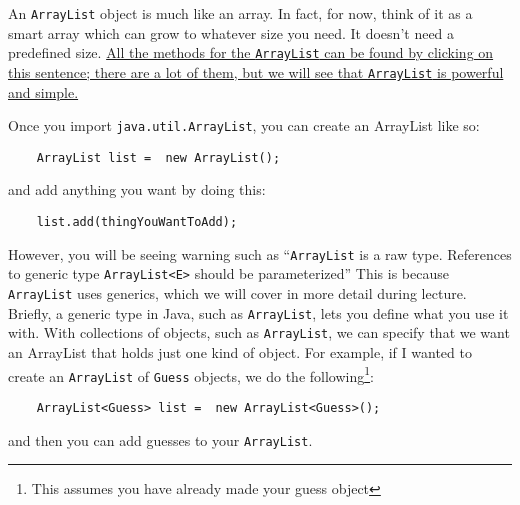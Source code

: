 \documentclass[10pt,letterpaper]{article}
\begin{document}
	
	An \texttt{ArrayList} object is much like an array.  
	In fact, for now, think of it as a smart array which can grow to whatever size you need.
	It doesn't need a predefined size.
	\href{https://docs.oracle.com/javase/8/docs/api/java/util/ArrayList.html}{All the methods for the \texttt{ArrayList}  can be found by clicking on this sentence;  there are a lot of them, but we will see that \texttt{ArrayList}  is powerful and simple.}
	
	Once you import \texttt{java.util.ArrayList}, you can create an ArrayList like so:
	
	\begin{lstlisting}
	ArrayList list =  new ArrayList();
	\end{lstlisting}
	
	and add anything you want by doing this:
	
	\begin{lstlisting}
	list.add(thingYouWantToAdd);
	\end{lstlisting}
	
	However, you will be seeing warning such as ``\texttt{ArrayList} is a raw type. References to generic type \texttt{ArrayList<E>} should be parameterized''
	This is because \texttt{ArrayList} uses generics, which we will cover in more detail during lecture.
	Briefly, a generic type in Java, such as \texttt{ArrayList}, lets you define what you use it with.  
	With collections of objects, such as \texttt{ArrayList}, we can specify that we want an ArrayList that holds just one kind of object.
	For example, if I wanted to create an \texttt{ArrayList} of \texttt{Guess} objects, we do the following\footnote{This assumes you have already made your guess object}:
	
	\begin{lstlisting}
	ArrayList<Guess> list =  new ArrayList<Guess>();
	\end{lstlisting}
		
	and then you can add guesses to your \texttt{ArrayList}.
	
	
	\newpage
\end{document}
